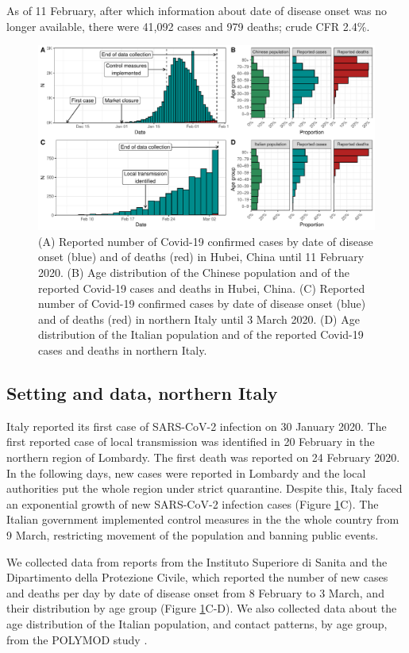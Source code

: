 \documentclass{article}
\begin{document}
As of 11 February, after which information about date of disease onset was no longer available, there were 41,092 cases and 979 deaths; crude CFR 2.4\%. 


\begin{figure}[t]
	\includegraphics[width=\linewidth]{../format_output/figures/data_fig.pdf}
	\caption{(A) Reported number of Covid-19 confirmed cases by date of disease onset (blue) and of deaths (red) in Hubei, China until 11 February 2020. (B) Age distribution of the Chinese population and of the reported Covid-19 cases and deaths in Hubei, China. (C) Reported number of Covid-19 confirmed cases by date of disease onset (blue) and of deaths (red) in northern Italy until 3 March 2020. (D) Age distribution of the Italian population and of the reported Covid-19 cases and deaths in northern Italy.}
	\label{fig:desc}
\end{figure}


\subsection*{Setting and data, northern Italy}

Italy reported its first case of SARS-CoV-2 infection on 30 January 2020. 
The first reported case of local transmission was identified in 20 February in the northern region of Lombardy. 
The first death was reported on 24 February 2020.
In the following days, new cases were reported in Lombardy and the local authorities put the whole region under strict quarantine. 
Despite this, Italy faced an exponential growth of new SARS-CoV-2 infection cases (Figure \ref{fig:desc}C). 
The Italian government implemented control measures in the the whole country from 9 March, restricting movement of the population and banning public events. 

We collected data from reports from the Instituto Superiore di Sanita and the Dipartimento della Protezione Civile, which reported the number of new cases and deaths per day by date of disease onset from 8 February to 3 March, and their distribution by age group \cite{Civile,IstitutoSuperiorediSanita} (Figure \ref{fig:desc}C-D). 
We also collected data about the age distribution of the Italian population, and contact patterns, by age group, from the POLYMOD study \cite{mossong2008social}.
\end{document}
